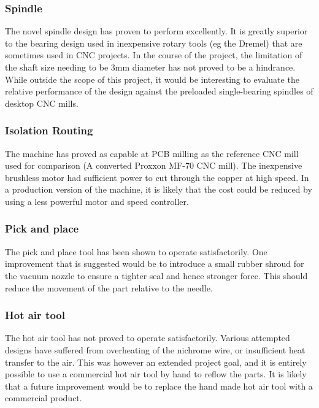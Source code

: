 \subsubsection{Spindle}
The novel spindle design has proven to perform excellently. It is greatly
superior to the bearing design used in inexpensive rotary tools (eg the Dremel)
that are sometimes used in CNC projects. In the course of the project, the
limitation of the shaft size needing to be 3mm diameter has not proved to
be a hindrance. While outside the scope of this project, it would be
interesting to evaluate the relative performance of the design against
the preloaded single-bearing spindles of desktop CNC mills.

\subsubsection{Isolation Routing}
The machine has proved as capable at PCB milling as the reference CNC
mill used for comparison (A converted Proxxon MF-70 CNC mill). The
inexpensive brushless motor had sufficient power to cut through the copper
at high speed. In a production version of the machine, it is likely that
the cost could be reduced by using a less powerful motor and speed
controller.

\subsubsection{Pick and place}
The pick and place tool has been shown to operate satisfactorily. One
improvement that is suggested would be to introduce a small rubber shroud
for the vacuum nozzle to ensure a tighter seal and hence stronger force.
This should reduce the movement of the part relative to the needle.

\subsubsection{Hot air tool}
The hot air tool has not proved to operate satisfactorily. Various
attempted designs have suffered from overheating of the nichrome wire,
or insufficient heat transfer to the air. This was however an extended
project goal, and it is entirely possible to use a commercial hot air tool
by hand to reflow the parts. It is likely that a future improvement would
be to replace the hand made hot air tool with a commercial product.





